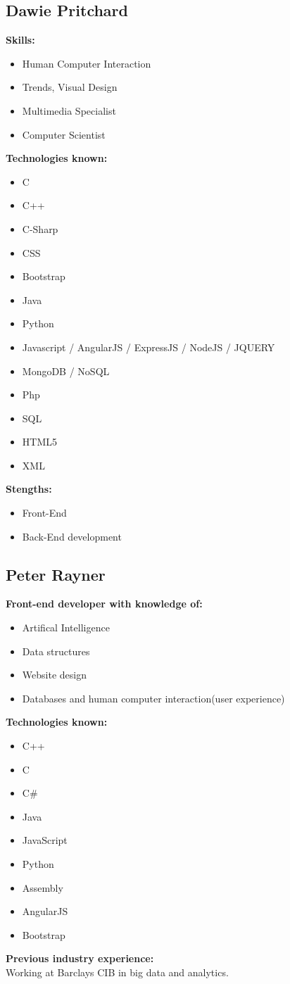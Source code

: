 \documentclass{article}
\begin{document}
\subsection{Dawie Pritchard}
\textbf{Skills:}
\begin{itemize}
 	\item Human Computer Interaction
 	\item Trends, Visual Design 
 	\item Multimedia Specialist
 	\item Computer Scientist
\end {itemize}
\textbf{Technologies known:}
\begin{itemize}
	\item C
 	\item C++
 	\item C-Sharp
 	\item CSS
 	\item Bootstrap
 	\item Java
 	\item Python
 	\item Javascript / AngularJS / ExpressJS / NodeJS / JQUERY
 	\item MongoDB / NoSQL
 	\item Php
 	\item SQL
 	\item HTML5
 	\item XML
 \end{itemize}
\textbf{Stengths:} 
\begin{itemize}
	\item Front-End
	\item Back-End development
\end{itemize}

\newpage
\subsection {Peter Rayner}

\textbf{Front-end developer with knowledge of:}
\begin{itemize}
 	\item Artifical Intelligence
 	\item Data structures 
 	\item Website design 
 	\item Databases and human computer interaction(user experience)
 \end{itemize}
\textbf{Technologies known:}
\begin{itemize}
	\item C++ 
	\item C 
	\item C\# 
	\item Java 
	\item JavaScript 
	\item Python 
	\item Assembly 
	\item AngularJS  
	\item Bootstrap
 \end{itemize}
\textbf{Previous industry experience:}\\
Working at Barclays CIB in big data and analytics.
\\
\newpage
\end{document}
